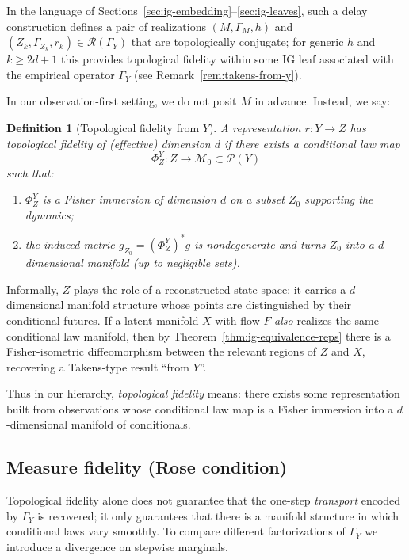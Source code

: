 \documentclass[11pt]{article}
\newtheorem{definition}{Definition}
\newcommand{\1}{\mathbf{1}}
\begin{document}
In the language of Sections~\ref{sec:ig-embedding}--\ref{sec:ig-leaves}, such a delay construction defines a pair of realizations $(M,\Gamma_M,h)$ and $(Z_k,\Gamma_{Z_k},r_k) \in \mathcal R(\Gamma_Y)$ that are topologically conjugate; for generic $h$ and $k\ge 2d+1$ this provides topological fidelity within some IG leaf associated with the empirical operator $\Gamma_Y$ (see Remark~\ref{rem:takens-from-y}).

In our observation-first setting, we do not posit $M$ in advance. Instead, we say:

\begin{definition}[Topological fidelity from $Y$]
A representation $r:Y\to Z$ has \emph{topological fidelity} of (effective) dimension $d$ if there exists a conditional law map
\[
  \Phi_Z^Y : Z \to \mathcal M_0 \subset\mathcal P(Y)
\]
such that:
\begin{enumerate}[label=(T\arabic*),leftmargin=1.8em]
  \item $\Phi_Z^Y$ is a Fisher immersion of dimension $d$ on a subset $Z_0$ supporting the dynamics;
  \item the induced metric $g_{Z_0} = (\Phi_Z^Y)^\ast g$ is nondegenerate and turns $Z_0$ into a $d$-dimensional manifold (up to negligible sets).
\end{enumerate}
\end{definition}

Informally, $Z$ plays the role of a reconstructed state space: it carries a $d$-dimensional manifold structure whose points are distinguished by their conditional futures. If a latent manifold $X$ with flow $F$ \emph{also} realizes the same conditional law manifold, then by Theorem~\ref{thm:ig-equivalence-reps} there is a Fisher-isometric diffeomorphism between the relevant regions of $Z$ and $X$, recovering a Takens-type result ``from $Y$''.

Thus in our hierarchy, \emph{topological fidelity} means: there exists some representation built from observations whose conditional law map is a Fisher immersion into a $d$-dimensional manifold of conditionals.

\subsection{Measure fidelity (Rose condition)}

Topological fidelity alone does not guarantee that the one-step \emph{transport} encoded by $\Gamma_Y$ is recovered; it only guarantees that there is a manifold structure in which conditional laws vary smoothly. To compare different factorizations of $\Gamma_Y$ we introduce a divergence on stepwise marginals.
\end{document}
